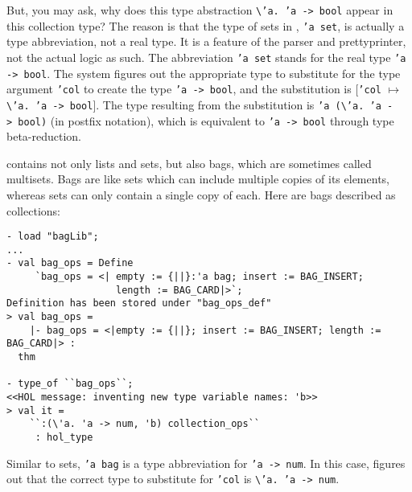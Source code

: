 
But, you may ask, why does this type abstraction \verb|\|\texttt{'a.~'a~->~bool}
appear in this collection type?  The reason is that the type of sets in \HOL,
\texttt{'a set}, is actually a type abbreviation, not a real type. It is a feature
of the parser and prettyprinter, not the actual logic as such.  The abbreviation
\texttt{'a set} stands for the real type \texttt{'a -> bool}. The \HOLW{} system
figures out the appropriate type to substitute for the type argument \texttt{'col}
to create the type \texttt{'a -> bool},
and the substitution is [\texttt{'col} $\mapsto$ \verb|\|\texttt{'a.~'a~->~bool}].
The type resulting from the substitution
is \texttt{'a~(}\verb|\|\texttt{'a.~'a~->~bool)} (in postfix notation),
which is equivalent to \texttt{'a~->~bool} through type beta-reduction.

\HOL{} contains not only lists and sets, but also bags, which are sometimes
called multisets. Bags are like sets which can include multiple copies of
its elements, whereas sets can only contain a single copy of each.
Here are bags described as collections:
\begin{session}
\begin{verbatim}
- load "bagLib";
...
- val bag_ops = Define
     `bag_ops = <| empty := {||}:'a bag; insert := BAG_INSERT;
                   length := BAG_CARD|>`;
Definition has been stored under "bag_ops_def"
> val bag_ops =
    |- bag_ops = <|empty := {||}; insert := BAG_INSERT; length := BAG_CARD|> :
  thm

- type_of ``bag_ops``;
<<HOL message: inventing new type variable names: 'b>>
> val it =
    ``:(\'a. 'a -> num, 'b) collection_ops``
     : hol_type
\end{verbatim}
\end{session}
Similar to sets, \texttt{'a bag} is a type abbreviation for \texttt{'a -> num}.
In this case, \HOLW{} figures out that the correct type to substitute for
\texttt{'col} is \verb|\|\texttt{'a.~'a~->~num}.

